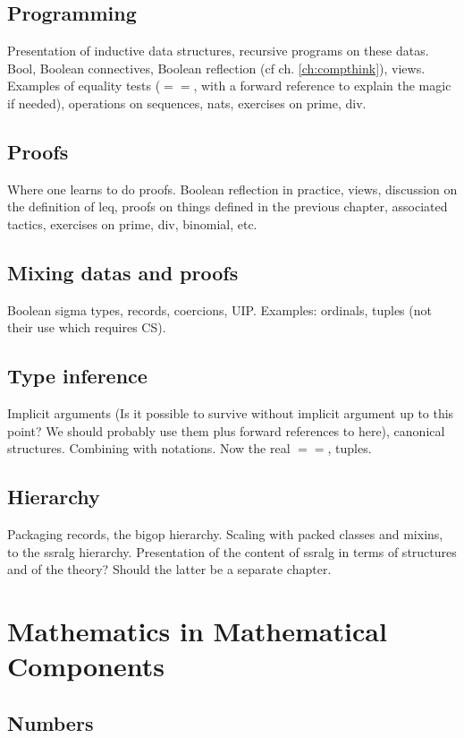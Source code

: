 \documentclass{book}
\begin{document}
\chapter{Programming}

Presentation of inductive data structures, recursive programs on these
datas.
Bool, Boolean connectives, Boolean reflection (cf
ch. \ref{ch:compthink}), views.
Examples of equality tests ($==$, with a forward reference to
explain the magic if needed), operations on sequences, nats,
exercises on prime, div.

\chapter{Proofs}

Where one learns to do proofs.
Boolean reflection in practice, views, discussion on the definition of leq,
proofs on things defined in the
previous chapter, associated tactics, exercises on prime, div,
binomial, etc.

\chapter{Mixing datas and proofs}
Boolean sigma types, records, coercions, UIP. Examples: ordinals,
tuples (not their use which requires CS).

\chapter{Type inference}

Implicit arguments (Is it possible to survive without implicit
argument up to this point? We should probably use them plus forward
references to here), canonical structures. Combining with
notations. Now the real $==$, tuples.
\chapter{Hierarchy}
Packaging records, the bigop hierarchy.
Scaling with packed classes and mixins, to the ssralg
hierarchy. Presentation of the content of ssralg in terms of structures
and of the theory? Should the latter be a separate chapter.

\part{Mathematics in Mathematical Components}

\chapter{Numbers}
\end{document}

